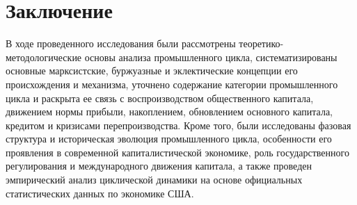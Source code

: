 \chapter*{Заключение}                       %

В ходе проведенного исследования были рассмотрены теоретико-методологические основы анализа промышленного цикла, систематизированы основные марксистские, буржуазные и эклектические концепции его происхождения и механизма, уточнено содержание категории промышленного цикла и раскрыта ее связь с воспроизводством общественного капитала, движением нормы прибыли, накоплением, обновлением основного капитала, кредитом и кризисами перепроизводства. Кроме того, были исследованы фазовая структура и историческая эволюция промышленного цикла, особенности его проявления в современной капиталистической экономике, роль государственного регулирования и международного движения капитала, а также проведен эмпирический анализ циклической динамики на основе официальных статистических данных по экономике США.

